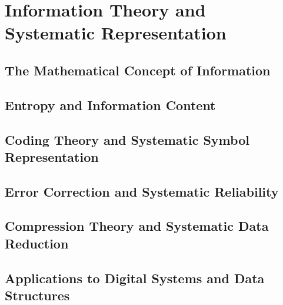 

\chapter{Information Theory and Systematic Representation}

\section{The Mathematical Concept of Information}

\section{Entropy and Information Content}

\section{Coding Theory and Systematic Symbol Representation}

\section{Error Correction and Systematic Reliability}

\section{Compression Theory and Systematic Data Reduction}

\section{Applications to Digital Systems and Data Structures}
